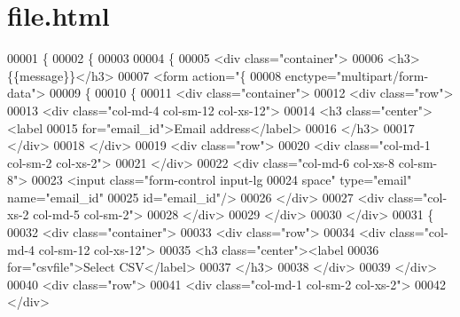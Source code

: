 \hypertarget{file_8html_source}{}\section{file.\+html}
\label{file_8html_source}

\begin{DoxyCode}
00001 \{%
00002 \{%
00003 
00004 \{%
00005     <div class="container">
00006         <h3>\{\{message\}\}</h3>
00007         <form action="\{%
00008             enctype="multipart/form-data">
00009             \{%
00010             \{%
00011                 <div class="container">
00012                         <div class="row">
00013                             <div class="col-md-4 col-sm-12 col-xs-12"> 
00014                                 <h3 class="center"><label 
00015                                     for="email\_id">Email address</label>
00016                                 </h3>
00017                             </div>
00018                         </div>
00019                         <div class="row">
00020                             <div class="col-md-1 col-sm-2 col-xs-2">
00021                             </div>
00022                             <div class="col-md-6 col-xs-8 col-sm-8">
00023                                 <input class="form-control input-lg 
00024                                     space" type="email" name="email\_id" 
00025                                     id="email\_id"/>
00026                             </div>
00027                             <div class="col-xs-2 col-md-5 col-sm-2">
00028                             </div>
00029                         </div>
00030                </div>
00031             \{%
00032                <div class="container">
00033                     <div class="row">
00034                         <div class="col-md-4 col-sm-12 col-xs-12"> 
00035                             <h3 class="center"><label 
00036                                 for="csvfile">Select CSV</label>
00037                             </h3>
00038                         </div>
00039                     </div>
00040                     <div class="row">
00041                         <div class="col-md-1 col-sm-2 col-xs-2">
00042                         </div>

\end{DoxyCode}
